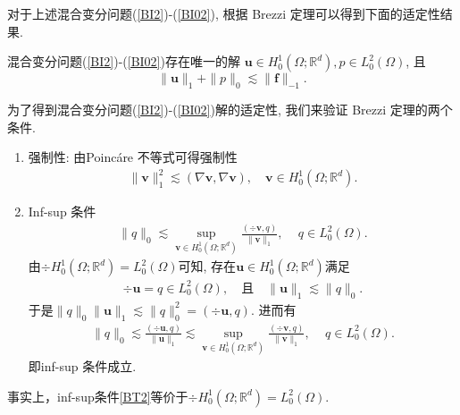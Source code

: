 对于上述混合变分问题(\ref{BI2})-(\ref{BI02}), 根据 Brezzi 定理可以得到下面的适定性结果.
\begin{theorem}\label{Tem01}
混合变分问题(\ref{BI2})-(\ref{BI02})存在唯一的解
 $\boldsymbol{u}\in H_0^{1}(\Omega; \mathbb{R}^{d}), p\in L_{0}^{2}(\Omega)$, 且
\begin{equation*}
\|\boldsymbol{u}\|_{1}+\|p\|_{0}\lesssim \|\boldsymbol{f}\|_{-1}.
\end{equation*}
\end{theorem}
\begin{prf}
为了得到混合变分问题(\ref{BI2})-(\ref{BI02})解的适定性, 我们来验证  Brezzi 定理的两个条件.
\begin{enumerate}
\item 强制性:
由Poinc\'{a}re 不等式可得强制性
\begin{align}\label{BI5}
\|\boldsymbol{v}\|^{2}_{1}
\lesssim (\nabla\boldsymbol{v},\nabla\boldsymbol{v}),\quad \boldsymbol{v}\in H_0^{1}(\Omega; \mathbb{R}^{d}).
\end{align}
\item Inf-sup 条件
\begin{align}\label{BT2}
\|q\|_{0}\lesssim\sup _{\boldsymbol{v} \in H_0^{1}(\Omega; \mathbb{R}^{d})}
\frac{(\div\boldsymbol{v}, q)}{\|\boldsymbol{v}\|_{1}},\quad\, q\in L_{0}^{2}(\Omega).
\end{align}
由$\div H_0^{1}(\Omega; \mathbb{R}^{d})=L_{0}^{2}(\Omega)$可知, 存在$\boldsymbol{u}\in H_0^{1}(\Omega; \mathbb{R}^{d})$满足
\begin{align*}
\div{\boldsymbol{u}}=q\in L_{0}^{2}(\Omega),\quad \text{且}\quad\|\boldsymbol{u}\|_1\lesssim \|q\|_0.
\end{align*}
于是$\|q\|_0\|\boldsymbol{u}\|_1\lesssim \|q\|_0^{2}=(\div{\boldsymbol{u}},q)$.
进而有
\begin{align}\label{BW2}
\|q\|_{0}\lesssim \frac{(\div{\boldsymbol{u}},q)}{\|\boldsymbol{u}\|_1}\lesssim\sup _{\boldsymbol{v} \in H_0^{1}(\Omega; \mathbb{R}^{d})}
\frac{(\div\boldsymbol{v}, q)}{\|\boldsymbol{v}\|_{1}},\quad\, q\in L_{0}^{2}(\Omega).
\end{align}
即inf-sup 条件成立.
\end{enumerate}
\end{prf}
事实上，inf-sup条件\eqref{BT2}等价于$\div H_0^{1}(\Omega; \mathbb{R}^{d})=L_{0}^{2}(\Omega)$.


